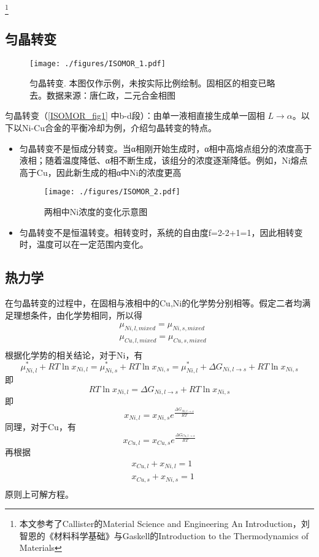 \footnote{本文参考了Callister的Material Science and Engineering An Introduction，刘智恩的《材料科学基础》与Gaskell的Introduction to the Thermodynamics of Materials}

\subsection{匀晶转变}

\begin{figure}[ht]
\centering
\texttt{[image: ./figures/ISOMOR\_1.pdf]}
\caption{匀晶转变. 本图仅作示例，未按实际比例绘制。固相区的相变已略去。数据来源：唐仁政，二元合金相图} \label{ISOMOR_fig1}
\end{figure}

匀晶转变（\autoref{ISOMOR_fig1} 中b-d段）：由单一液相直接生成单一固相 $L\rightarrow\alpha$。以下以Ni-Cu合金的平衡冷却为例，介绍匀晶转变的特点。

\begin{itemize}
\item 匀晶转变不是恒成分转变。当α相刚开始生成时，α相中高熔点组分的浓度高于液相；随着温度降低、α相不断生成，该组分的浓度逐渐降低。例如，Ni熔点高于Cu，因此新生成的相α中Ni的浓度更高
\begin{figure}[ht]
\centering
\texttt{[image: ./figures/ISOMOR\_2.pdf]}
\caption{两相中Ni浓度的变化示意图} \label{ISOMOR_fig2}
\end{figure}

\item 匀晶转变不是恒温转变。相转变时，系统的自由度f=2-2+1=1，因此相转变时，温度可以在一定范围内变化。
\end{itemize}

\subsection{热力学}
在匀晶转变的过程中，在固相与液相中的Cu,Ni的化学势分别相等。假定二者均满足理想条件，由化学势相同，所以得
\begin{align}
&\mu_{Ni,l,mixed}=\mu_{Ni,s,mixed}\\
&\mu_{Cu,l,mixed}=\mu_{Cu,s,mixed}\\
\end{align}
根据化学势的相关结论，对于Ni，有
$$
\mu_{Ni,l}^*+RT \ln x_{Ni,l}=\mu_{Ni,s}^*+RT \ln x_{Ni,s}=\mu_{Ni,l}^*+\Delta G_{Ni, l\rightarrow s} + RT \ln x_{Ni,s}
$$
即
$$
RT \ln x_{Ni,l}=\Delta G_{Ni, l\rightarrow s} + RT \ln x_{Ni,s}
$$
即
\begin{equation}
x_{Ni,l}=x_{Ni,s}e^{\frac{\Delta G_{Ni, l\rightarrow s}}{RT}}
\end{equation}
同理，对于Cu，有
\begin{equation}
x_{Cu,l}=x_{Cu,s}e^{\frac{\Delta G_{Cu, l\rightarrow s}}{RT}}
\end{equation}
再根据
\begin{align}
&x_{Cu,l}+x_{Ni,l}=1\\
&x_{Cu,s}+x_{Ni,s}=1\\
\end{align}
原则上可解方程。
